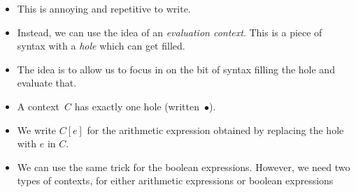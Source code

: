 \documentclass{lecturenotes}
\newcommand{\astep}{\ensuremath{\mathrel{\longrightarrow_a}}}
\begin{document}
\begin{itemize}
\item This is annoying and repetitive to write.
\item Instead, we can use the idea of an \emph{evaluation context}.
  This is a piece of syntax with a \emph{hole} which can get filled.
\item The idea is to allow us to focus in on the bit of syntax filling the hole and evaluate that.
\end{itemize}

\begin{syntax}
  \alternative{\bullet}
\end{syntax}

\begin{itemize}
\item A context~$C$ has exactly one hole (written~$\bullet$).
\item We write $C[e]$ for the arithmetic expression obtained by replacing the hole with $e$ in $C$.
\item We can use the same trick for the boolean expressions.
  However, we need two types of contexts, for either arithmetic expressions or boolean expressions
\end{itemize}
\end{document}
